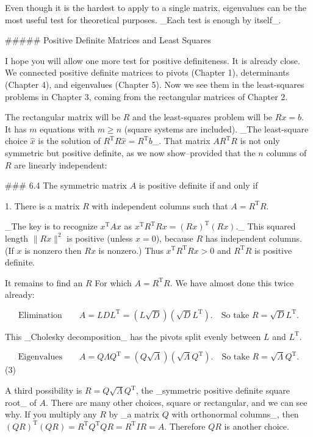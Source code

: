 Even though it is the hardest to apply to a single matrix, eigenvalues can be the most useful test for theoretical purposes. _Each test is enough by itself_.

##### Positive Definite Matrices and Least Squares

I hope you will allow one more test for positive definiteness. It is already close. We connected positive definite matrices to pivots (Chapter 1), determinants (Chapter 4), and eigenvalues (Chapter 5). Now we see them in the least-squares problems in Chapter 3, coming from the rectangular matrices of Chapter 2.

The rectangular matrix will be \(R\) and the least-squares problem will be \(Rx=b\). It has \(m\) equations with \(m\geq n\) (square systems are included). _The least-square choice \(\widehat{x}\) is the solution of \(R^{\mathrm{T}}R\widehat{x}=R^{\mathrm{T}}b\)_. That matrix \(AR^{\mathrm{T}}R\) is not only symmetric but positive definite, as we now show--provided that the \(n\) columns of \(R\) are linearly independent:

### 6.4 The symmetric matrix \(A\) is positive definite if and only if

1. There is a matrix \(R\) with independent columns such that \(A=R^{\mathrm{T}}R\).

_The key is to recognize \(x^{\mathrm{T}}Ax\) as \(x^{\mathrm{T}}R^{\mathrm{T}}Rx=(Rx)^{\mathrm{T}}(Rx)\)._ This squared length \(\|Rx\|^{2}\) is positive (unless \(x=0\)), because \(R\) has independent columns. (If \(x\) is nonzero then \(Rx\) is nonzero.) Thus \(x^{\mathrm{T}}R^{\mathrm{T}}Rx>0\) and \(R^{\mathrm{T}}R\) is positive definite.

It remains to find an \(R\) For which \(A=R^{\mathrm{T}}R\). We have almost done this twice already:

\[\text{{Elimination}}\qquad A=LDL^{\mathrm{T}}=(L\sqrt{D})(\sqrt{D}L^{\mathrm{ T}}).\quad\text{So take }R=\sqrt{D}L^{\mathrm{T}}.\]

This _Cholesky decomposition_ has the pivots split evenly between \(L\) and \(L^{\mathrm{T}}\).

\[\text{{Eigenvalues}}\qquad A=Q\Lambda Q^{\mathrm{T}}=(Q\sqrt{\Lambda})(\sqrt{ \Lambda}Q^{\mathrm{T}}).\quad\text{So take }R=\sqrt{\Lambda}Q^{\mathrm{T}}.\] (3)

A third possibility is \(R=Q\sqrt{\Lambda}Q^{\mathrm{T}}\), the _symmetric positive definite square root_ of \(A\). There are many other choices, square or rectangular, and we can see why. If you multiply any \(R\) by _a matrix \(Q\) with orthonormal columns_, then \((QR)^{\mathrm{T}}(QR)=R^{\mathrm{T}}Q^{\mathrm{T}}QR=R^{\mathrm{T}}IR=A\). Therefore \(QR\) is another choice.

